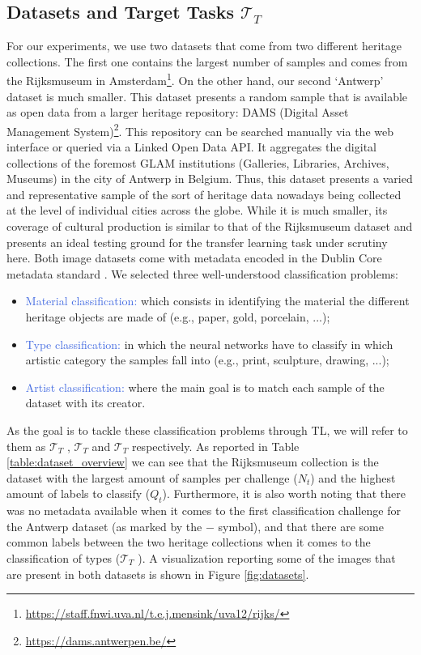 \subsection{Datasets and Target Tasks $\mathcal{T}_T$}
\label{subsec:datasets}

For our experiments, we use two datasets that come from two different heritage collections. The first one contains the largest number of samples and comes from the Rijksmuseum in Amsterdam\footnote{\url{https://staff.fnwi.uva.nl/t.e.j.mensink/uva12/rijks/}}. On the other hand, our second `Antwerp' dataset is much smaller. This dataset presents a random sample that is available as open data from a larger heritage repository: DAMS (Digital Asset Management System)\footnote{\url{https://dams.antwerpen.be/}}. This repository can be searched manually via the web interface or queried via a Linked Open Data API. It aggregates the digital collections of the foremost GLAM institutions  (Galleries, Libraries, Archives, Museums) in the city of Antwerp in Belgium. Thus, this dataset presents a varied and representative sample of the sort of heritage data nowadays being collected at the level of individual cities across the globe. While it is much smaller, its coverage of cultural production is similar to that of the Rijksmuseum dataset and presents an ideal testing ground for the transfer learning task under scrutiny here. Both image datasets come with metadata encoded in the Dublin Core metadata standard \cite{weibel1998dublin}. We selected three well-understood classification problems:
\begin{itemize}
	\item \textcolor{RoyalBlue}{Material classification:} which consists in identifying the material the different heritage objects are made of (e.g., paper, gold, porcelain, ...); 
	\item \textcolor{RoyalBlue}{Type classification:} in which the neural networks have to classify in which artistic category the samples fall into (e.g., print, sculpture, drawing, ...);
	\item \textcolor{RoyalBlue}{Artist classification:} where the main goal is to match each sample of the dataset with its creator.
\end{itemize}

As the goal is to tackle these classification problems through TL, we will refer to them as $\mathcal{T}_T$ , $\mathcal{T}_T$  and $\mathcal{T}_T$  respectively. As reported in Table \ref{table:dataset_overview} we can see that the Rijksmuseum collection is the dataset with the largest amount of samples per challenge ($N_t$) and the highest amount of labels to classify ($Q_t$). Furthermore, it is also worth noting that there was no metadata available when it comes to the first classification challenge for the Antwerp dataset (as marked by the $-$ symbol), and that there are some common labels between the two heritage collections when it comes to the classification of types ($\mathcal{T}_T$ ). A visualization reporting some of the images that are present in both datasets is shown in Figure \ref{fig:datasets}.


